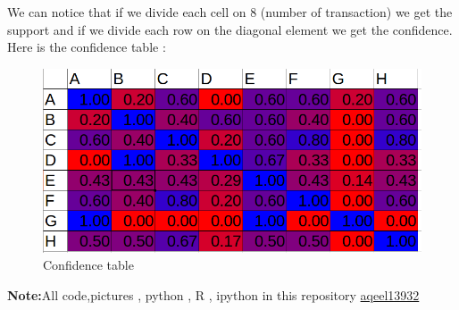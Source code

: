 \documentclass{article}
\begin{document}
We can notice that if we divide each cell on 8 (number of transaction) we get the support and if we divide each row on the diagonal element we get the confidence.\\
Here is the confidence table :
\begin{figure}[H]
	\includegraphics[scale=0.6]{5q2.png}
\caption{Confidence table}
\end{figure}
\textbf{Note:}All code,pictures , python , R , ipython in this repository \href{https://github.com/aqeel13932/DM/tree/master/HW05}{aqeel13932}
\end{document}

